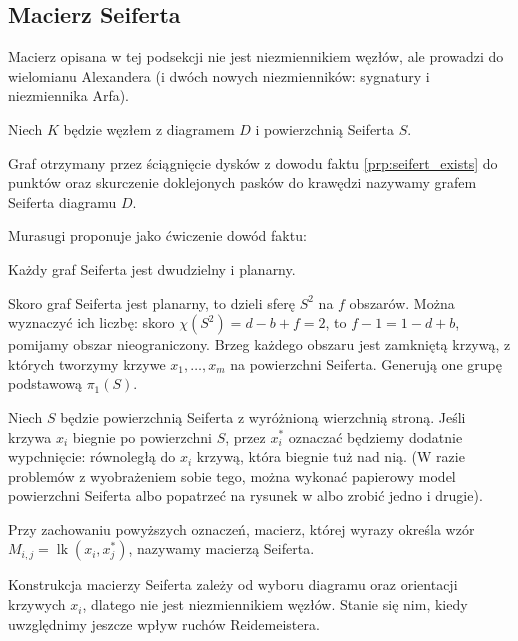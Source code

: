 
\subsection{Macierz Seiferta}

Macierz opisana w tej podsekcji nie jest niezmiennikiem węzłów, ale prowadzi do wielomianu Alexandera (i dwóch nowych niezmienników: sygnatury i niezmiennika Arfa).

Niech $K$ będzie węzłem z diagramem $D$ i powierzchnią Seiferta $S$.

\begin{definition}
%
    Graf otrzymany przez ściągnięcie dysków z dowodu faktu \ref{prp:seifert_exists} do punktów oraz skurczenie doklejonych pasków do krawędzi nazywamy grafem Seiferta diagramu $D$.
\end{definition}

Murasugi \cite[s. 79]{murasugi1996} proponuje jako ćwiczenie dowód faktu:

\begin{proposition}
    Każdy graf Seiferta jest dwudzielny i planarny.
\end{proposition}

Skoro graf Seiferta jest planarny, to dzieli sferę $S^2$ na $f$ obszarów.
Można wyznaczyć ich liczbę: skoro $\chi(S^2) = d - b + f = 2$, to $f - 1 = 1 - d + b$, pomijamy obszar nieograniczony.
Brzeg każdego obszaru jest zamkniętą krzywą, z których tworzymy krzywe $x_1, \ldots, x_m$ na powierzchni Seiferta.
Generują one grupę podstawową $\pi_1(S)$.

Niech $S$ będzie powierzchnią Seiferta z wyróżnioną wierzchnią stroną.
Jeśli krzywa $x_i$ biegnie po powierzchni $S$, przez $x_i^*$ oznaczać będziemy dodatnie wypchnięcie: równoległą do $x_i$ krzywą, która biegnie tuż nad nią.
(W razie problemów z wyobrażeniem sobie tego, można wykonać papierowy model powierzchni Seiferta albo popatrzeć na rysunek w \cite[s. 111]{livingston1993} albo zrobić jedno i drugie).

\begin{definition}
%
    Przy zachowaniu powyższych oznaczeń, macierz, której wyrazy określa wzór $M_{i,j} = \operatorname{lk}(x_i, x_j^*)$, nazywamy macierzą Seiferta.
\end{definition}

Konstrukcja macierzy Seiferta zależy od wyboru diagramu oraz orientacji krzywych $x_i$, dlatego nie jest niezmiennikiem węzłów.
Stanie się nim, kiedy uwzględnimy jeszcze wpływ ruchów Reidemeistera.

